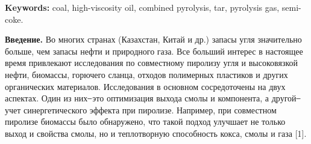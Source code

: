 {\bfseries Keywords:} coal, high-viscosity oil, combined pyrolysis, tar,
pyrolysis gas, semi-coke.

\begin{multicols}{2}
{\bfseries Введение.} Во многих странах (Казахстан, Китай и др.) запасы
угля значительно больше, чем запасы нефти и природного газа. Все больший
интерес в настоящее время привлекают исследования по совместному
пиролизу угля и высоковязкой нефти, биомассы, горючего сланца, отходов
полимерных пластиков и других органических материалов. Исследования в
основном сосредоточены на двух аспектах. Один из них ̶ это оптимизация
выхода смолы и компонента, а другой ̶ учет синергетического эффекта при
пиролизе. Например, при совместном пиролизе биомассы было обнаружено,
что такой подход улучшает не только выход и свойства смолы, но и
теплотворную способность кокса, смолы и газа {[}1{]}.


\end{multicols}

